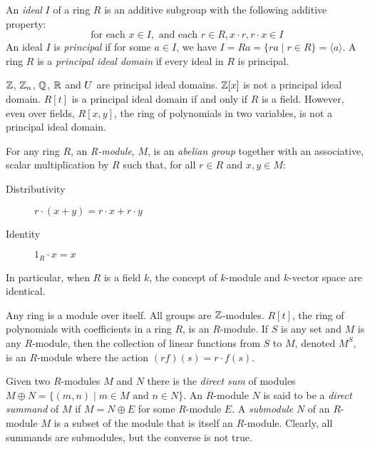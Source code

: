 \begin{definition}[Ideal]
An \emph{ideal} $I$ of a ring $R$ is an additive subgroup with the following additive property:
\[ \textrm{ for each } x \in I, \textrm{ and each } r \in R, x \cdot r, r \cdot x \in I  \]
An ideal $I$ is \emph{principal} if for some $a \in I$, we have $I = Ra =\{ ra \mid r \in R\} = \langle a \rangle$.
A ring $R$ is a \emph{principal ideal domain} if every ideal in $R$ is principal.
\end{definition}
\begin{example}
$\mathbb{Z}$, $\mathbb{Z}_n$, $\mathbb{Q}$, $\mathbb{R}$ and $U$ are principal ideal domains. $\mathbb{Z}[x]$ is not a principal ideal domain. $R[t]$ is a principal ideal domain if and only if $R$ is a field. However,
even over fields, $R[x,y]$, the ring of polynomials in two variables, is not a principal ideal domain.
\end{example}
\begin{definition}[Module]
For any ring $R$, an \emph{R-module}, $M$, is an \emph{abelian group} together with an associative, scalar multiplication by $R$ such that, for all $r \in R$ and $x,y \in M$:
\begin{description}
\item[Distributivity]  $r \cdot (x + y)  = r \cdot x + r \cdot y$
\item[Identity] $1_R \cdot x = x$
\end{description}
\end{definition}
In particular, when $R$ is a field $k$, the concept of $k$-module and $k$-vector space are identical.
\begin{example}
Any ring is a module over itself.  All groups are $\mathbb{Z}$-modules. $R[t]$, the ring of polynomials with coefficients in a ring $R$, is an $R$-module. If $S$ is any set and $M$ is any $R$-module, then the collection of linear functions from $S$ to $M$, denoted $M^S$, is an $R$-module where the action $(rf)(s) =  r \cdot f(s)$.
\end{example}
\begin{definition}
Given two $R$-modules $M$ and $N$ there is the \emph{direct sum} of modules $M \oplus N = \{ (m,n) \mid m \in M \textrm{ and } n \in N \}$.
An $R$-module $N$ is said to be a \emph{direct summand} of $M$ if $M = N \oplus E$ for some $R$-module $E$. 
A \emph{submodule} $N$ of an $R$-module $M$ is a subset of the module that is itself an $R$-module. Clearly, all summands are submodules, but the converse is not true.
\end{definition}
